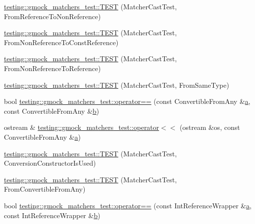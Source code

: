 \begin{DoxyCompactItemize}
\hyperlink{namespacetesting_1_1gmock__matchers__test_a4bb3955a1e0b603c0156c98a2dc49eea}{testing\+::gmock\+\_\+matchers\+\_\+test\+::\+T\+E\+ST} (Matcher\+Cast\+Test, From\+Reference\+To\+Non\+Reference)
\item 
\hyperlink{namespacetesting_1_1gmock__matchers__test_a6fd48b8275f96d9d4ee840f0ec590fb1}{testing\+::gmock\+\_\+matchers\+\_\+test\+::\+T\+E\+ST} (Matcher\+Cast\+Test, From\+Non\+Reference\+To\+Const\+Reference)
\item 
\hyperlink{namespacetesting_1_1gmock__matchers__test_ab8d3174b8f1ab799906938ed9984643b}{testing\+::gmock\+\_\+matchers\+\_\+test\+::\+T\+E\+ST} (Matcher\+Cast\+Test, From\+Non\+Reference\+To\+Reference)
\item 
\hyperlink{namespacetesting_1_1gmock__matchers__test_a8f845dd5b1bcdc660926d67dce32b5d2}{testing\+::gmock\+\_\+matchers\+\_\+test\+::\+T\+E\+ST} (Matcher\+Cast\+Test, From\+Same\+Type)
\item 
bool \hyperlink{namespacetesting_1_1gmock__matchers__test_af0b7ba716a9150ff6db37abda4b44fc8}{testing\+::gmock\+\_\+matchers\+\_\+test\+::operator==} (const Convertible\+From\+Any \&\hyperlink{_07copy_08_2_read_camera_model_8m_a551a3d351eadcc0b9b1a2f24f0fb5ea0}{a}, const Convertible\+From\+Any \&\hyperlink{jquery_8js_a2fa551895933fae935a0a6b87282241d}{b})
\item 
ostream \& \hyperlink{namespacetesting_1_1gmock__matchers__test_a2a2abd1e49c201ae26ed96211d4225eb}{testing\+::gmock\+\_\+matchers\+\_\+test\+::operator$<$$<$} (ostream \&os, const Convertible\+From\+Any \&\hyperlink{_07copy_08_2_read_camera_model_8m_a551a3d351eadcc0b9b1a2f24f0fb5ea0}{a})
\item 
\hyperlink{namespacetesting_1_1gmock__matchers__test_a42e4d7d26704516436281897cb41bb1b}{testing\+::gmock\+\_\+matchers\+\_\+test\+::\+T\+E\+ST} (Matcher\+Cast\+Test, Conversion\+Constructor\+Is\+Used)
\item 
\hyperlink{namespacetesting_1_1gmock__matchers__test_ae51787fccc0f0a27e3725039c6cd48dc}{testing\+::gmock\+\_\+matchers\+\_\+test\+::\+T\+E\+ST} (Matcher\+Cast\+Test, From\+Convertible\+From\+Any)
\item 
bool \hyperlink{namespacetesting_1_1gmock__matchers__test_a33c068c32bf5118e5be92771b146db77}{testing\+::gmock\+\_\+matchers\+\_\+test\+::operator==} (const Int\+Reference\+Wrapper \&\hyperlink{_07copy_08_2_read_camera_model_8m_a551a3d351eadcc0b9b1a2f24f0fb5ea0}{a}, const Int\+Reference\+Wrapper \&\hyperlink{jquery_8js_a2fa551895933fae935a0a6b87282241d}{b})
\item 

\end{DoxyCompactItemize}
